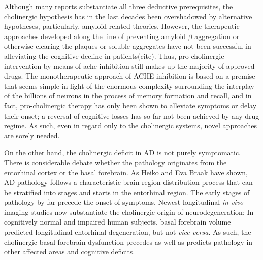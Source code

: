 Although many reports substantiate all three deductive prerequisites, the cholinergic hypothesis has in the last decades been overshadowed by alternative hypotheses, particularly, amyloid-related theories. However, the therapeutic approaches developed along the line of preventing amyloid $\beta$ aggregation or otherwise clearing the plaques or soluble aggregates have not been successful in alleviating the cognitive decline in patients(cite). Thus, pro-cholinergic intervention by means of \ac{ache} inhibition still makes up the majority of approved drugs. The monotherapeutic approach of ACHE inhibition is based on a premise that seems simple in light of the enormous complexity surrounding the interplay of the billions of neurons in the process of memory formation and recall, and in fact, pro-cholinergic therapy has only been shown to alleviate symptoms or delay their onset; a reversal of cognitive losses has so far not been achieved by any drug regime. As such, even in regard only to the cholinergic systems, novel approaches are sorely needed.

On the other hand, the cholinergic deficit in AD is not purely symptomatic. There is considerable debate whether the pathology originates from the entorhinal cortex or the basal forebrain. As Heiko and Eva Braak have shown\cite{Braak1995}, AD pathology follows a characteristic brain region distribution process that can be stratified into stages and starts in the entorhinal region. The early stages of pathology by far precede the onset of symptoms. Newest longitudinal \emph{in vivo} imaging studies now substantiate the cholinergic origin of neurodegeneration: In cognitively normal and impaired human subjects, basal forebrain volume predicted longitudinal entorhinal degeneration, but not \emph{vice versa}. As such, the cholinergic basal forebrain dysfunction precedes as well as predicts pathology in other affected areas and cognitive deficits\cite{Schmitz2016}.


